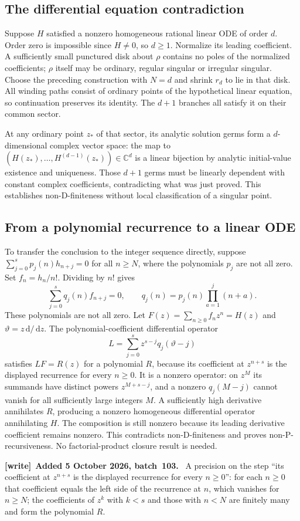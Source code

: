 \documentclass[11pt]{article}
\theoremstyle{remark}\newtheorem{remark}[theorem]{Remark}
\newcommand{\dd}{\,\mathrm d}
\newcommand{\C}{\mathbb C}
\numberwithin{equation}{section}
\newenvironment{writenote}[1][]{\par\smallskip\begingroup\small
 \noindent\textbf{[write]}\if\relax\detokenize{#1}\relax\else~\textbf{#1.}\fi\ }%
 {\par\endgroup\smallskip}
\begin{document}
\subsection{The differential equation contradiction}
Suppose $H$ satisfied a nonzero homogeneous rational linear ODE
of order $d$. Order zero is impossible since $H\ne0$, so $d\ge1$.
Normalize its leading coefficient. A sufficiently small punctured
disk about $\rho$ contains no poles of the normalized coefficients;
$\rho$ itself may be ordinary, regular singular or irregular singular.
Choose the preceding construction with $N=d$ and shrink $r_d$
to lie in that disk. All winding paths consist of ordinary points
of the hypothetical linear equation, so continuation preserves
its identity. The $d+1$ branches all satisfy it on their common
sector.

At any ordinary point $z_*$ of that sector, its analytic solution
germs form a $d$-dimensional complex vector space: the map to
$(H(z_*),\ldots,H^{(d-1)}(z_*))\in\C^d$ is a linear bijection
by analytic initial-value existence and uniqueness.
Those $d+1$ germs must be linearly dependent with constant complex
coefficients, contradicting what was just proved. This establishes
non-D-finiteness without local classification of a singular point.

\subsection{From a polynomial recurrence to a linear ODE}
To transfer the conclusion to the integer sequence directly,
suppose $\sum_{j=0}^sp_j(n)h_{n+j}=0$ for all $n\ge N$,
where the polynomials $p_j$ are not all zero.
Set $f_n=h_n/n!$. Dividing by $n!$ gives
\[
\sum_{j=0}^sq_j(n)f_{n+j}=0,\qquad
q_j(n)=p_j(n)\prod_{a=1}^j(n+a).
\]
These polynomials are not all zero. Let
$F(z)=\sum_{n\ge0}f_nz^n=H(z)$ and $\vartheta=z\dd/\dd z$.
The polynomial-coefficient differential operator
\[
L=\sum_{j=0}^s z^{s-j}q_j(\vartheta-j)
\]
satisfies $LF=R(z)$ for a polynomial $R$, because its coefficient
at $z^{n+s}$ is the displayed recurrence for every $n\ge0$.
It is a nonzero operator: on $z^M$ its summands have distinct
powers $z^{M+s-j}$, and a nonzero $q_j(M-j)$ cannot vanish for
all sufficiently large integers $M$.
A sufficiently high derivative annihilates $R$, producing a
nonzero homogeneous differential operator annihilating $H$.
The composition is still nonzero because its leading derivative
coefficient remains nonzero. This contradicts non-D-finiteness
and proves non-P-recursiveness. No factorial-product closure
result is needed.
\begin{writenote}[Added 5 October 2026, batch~103]
A precision on the step ``its coefficient at $z^{n+s}$ is the displayed recurrence for every $n\ge0$'': for each $n\ge0$ that coefficient equals the left side of the recurrence at $n$, which vanishes for $n\ge N$; the coefficients of $z^k$ with $k<s$ and those with $n<N$ are finitely many and form the polynomial $R$.
\end{writenote}
\end{document}
